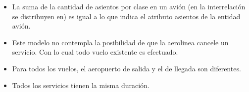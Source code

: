 \begin{itemize}
	\item La suma de la cantidad de asientos por clase en un avión (en la 
		  interrelación se distribuyen en) es igual a lo que indica el 
		  atributo asientos de la entidad avión.
	
	\item Este modelo no contempla la posibilidad de que la aerolinea 
          cancele un servicio. Con lo cual todo vuelo existente es efectuado.

    \item Para todos los vuelos, el aeropuerto de salida y el de llegada son
          diferentes.

    \item Todos los servicios tienen la misma duración.
            
  \end{itemize}
